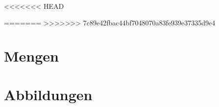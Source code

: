 \documentclass[a4paper,12pt, DIV12]{scrartcl}
\begin{document}
<<<<<<< HEAD

\newpage
=======
>>>>>>> 7c89e42fbac44bf7048070a83fe939e37335d9e4
\tableofcontents
\newpage
\section{Mengen}

\newpage

\newpage
\section{Abbildungen}

\newpage

\newpage

\newpage

\end{document}
